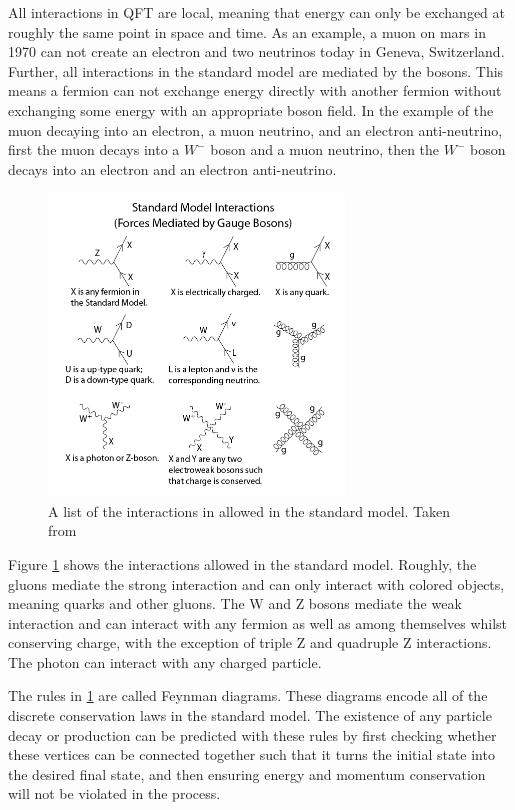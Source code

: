   All interactions in QFT are local, meaning that energy can only be exchanged at roughly the same point in space and time. As an example, a muon on mars in 1970 can not create an electron and two neutrinos today in Geneva, Switzerland. Further, all interactions in the standard model are mediated by the bosons. This means a fermion can not exchange energy directly with another fermion without exchanging some energy with an appropriate boson field. In the example of the muon decaying into an electron, a muon neutrino, and an electron anti-neutrino, first the muon decays into a $W^-$ boson and a muon neutrino, then the $W^-$ boson decays into an electron and an electron anti-neutrino.

  \begin{figure}[h!]
    \centering
    \includegraphics[width=0.7\textwidth]{figures/SM_feynman.png}
    \caption{A list of the interactions in allowed in the standard model. Taken from \cite{SM_feynman}}
    \label{fig:standard_model_feynman}
  \end{figure}  

  Figure \ref{fig:standard_model_feynman} shows the interactions allowed in the standard model. Roughly, the gluons mediate the strong interaction and can only interact with colored objects, meaning quarks and other gluons. The W and Z bosons mediate the weak interaction and can interact with any fermion as well as among themselves whilst conserving charge, with the exception of triple Z and quadruple Z interactions. The photon can interact with any charged particle.

  The rules in \ref{fig:standard_model_feynman} are called Feynman diagrams. These diagrams encode all of the discrete conservation laws in the standard model. The existence of any particle decay or production can be predicted with these rules by first checking whether these vertices can be connected together such that it turns the initial state into the desired final state, and then ensuring energy and momentum conservation will not be violated in the process.


